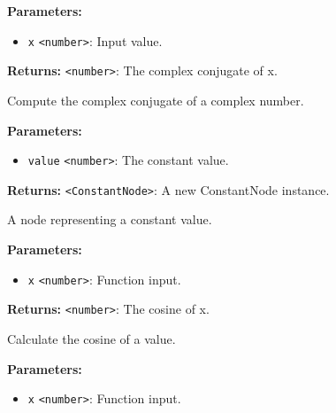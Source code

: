 \documentclass[12pt,a4paper]{article}
\begin{document}
\vspace{5mm}
\noindent {}


\noindent \textbf{Parameters:}
\begin{itemize}
  \item \texttt{x} \texttt{<number>}: Input value.
\end{itemize}

\noindent \textbf{Returns:} \texttt{<number>}: The complex conjugate of x.

\noindent Compute the complex conjugate of a complex number.

\vspace{5mm}
\noindent {}


\noindent \textbf{Parameters:}
\begin{itemize}
  \item \texttt{value} \texttt{<number>}: The constant value.
\end{itemize}

\noindent \textbf{Returns:} \texttt{<ConstantNode>}: A new ConstantNode instance.

\noindent A node representing a constant value.

\vspace{5mm}
\noindent {}


\noindent \textbf{Parameters:}
\begin{itemize}
  \item \texttt{x} \texttt{<number>}: Function input.
\end{itemize}

\noindent \textbf{Returns:} \texttt{<number>}: The cosine of x.

\noindent Calculate the cosine of a value.

\vspace{5mm}
\noindent {}


\noindent \textbf{Parameters:}
\begin{itemize}
  \item \texttt{x} \texttt{<number>}: Function input.
\end{itemize}
\end{document}
